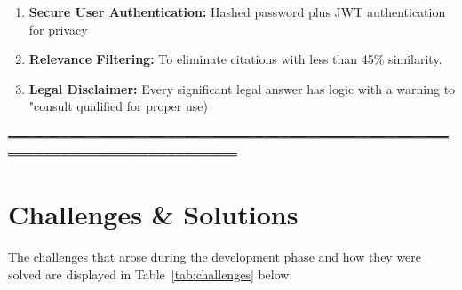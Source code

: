 \documentclass[12pt,a4paper]{article}
\begin{document}
\begin{enumerate}
  \item \textbf{Secure User Authentication:} Hashed password plus JWT authentication for privacy
  
  \item \textbf{Relevance Filtering:} To eliminate citations with less than 45\% similarity.

  \item \textbf{Legal Disclaimer:} {Every significant legal answer has logic with a warning to "consult qualified}
for proper use)
\end{enumerate}

════════════════════════════════════════════════════════════════════════════
\section{Challenges \& Solutions}

The challenges that arose during the development phase and how they were solved are displayed in Table~\ref{tab:challenges} below: 
\end{document}
